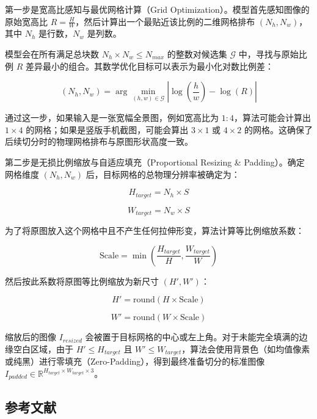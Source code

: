 第一步是宽高比感知与最优网格计算（Grid Optimization）。模型首先感知图像的原始宽高比 \(R=\frac{H}{W}\)，然后计算出一个最贴近该比例的二维网格排布 \((N_h,N_w)\)，其中 \(N_h\) 是行数，\(N_w\) 是列数。

模型会在所有满足总块数 \(N_h\times N_w\le N_{max}\) 的整数对候选集 \(\mathcal{G}\) 中，寻找与原始比例 \(R\) 差异最小的组合。其数学优化目标可以表示为最小化对数比例差：

\[
(N_h,N_w)=\arg\min_{(h,w)\in\mathcal{G}}\left|\log\left(\frac{h}{w}\right)-\log(R)\right|
\]

通过这一步，如果输入是一张宽幅全景图，例如宽高比为 \(1:4\)，算法可能会计算出 \(1\times4\) 的网格；如果是竖版手机截图，可能会算出 \(3\times1\) 或 \(4\times2\) 的网格。这确保了后续切分时的物理网格排布与原图形状高度一致。

第二步是无损比例缩放与自适应填充（Proportional Resizing \& Padding）。确定网格维度 \((N_h,N_w)\) 后，目标网格的总物理分辨率被确定为：

\[
H_{target}=N_h\times S
\]

\[
W_{target}=N_w\times S
\]

为了将原图放入这个网格中且不产生任何拉伸形变，算法计算等比例缩放系数：

\[
\mathrm{Scale}=\min\left(\frac{H_{target}}{H},\frac{W_{target}}{W}\right)
\]

然后按此系数将原图等比例缩放为新尺寸 \((H',W')\)：

\[
H'=\mathrm{round}(H\times\mathrm{Scale})
\]

\[
W'=\mathrm{round}(W\times\mathrm{Scale})
\]

缩放后的图像 \(I_{resized}\) 会被置于目标网格的中心或左上角。对于未能完全填满的边缘空白区域，由于 \(H'\le H_{target}\) 且 \(W'\le W_{target}\)，算法会使用背景色（如均值像素或纯黑）进行零填充（Zero-Padding），得到最终准备切分的标准图像 \(I_{padded}\in\mathbb{R}^{H_{target}\times W_{target}\times3}\)。

\FloatBarrier
{}
\hypertarget{ux53c2ux8003ux6587ux732e-78}{%
\subsection{参考文献}\label{ux53c2ux8003ux6587ux732e-78}}

